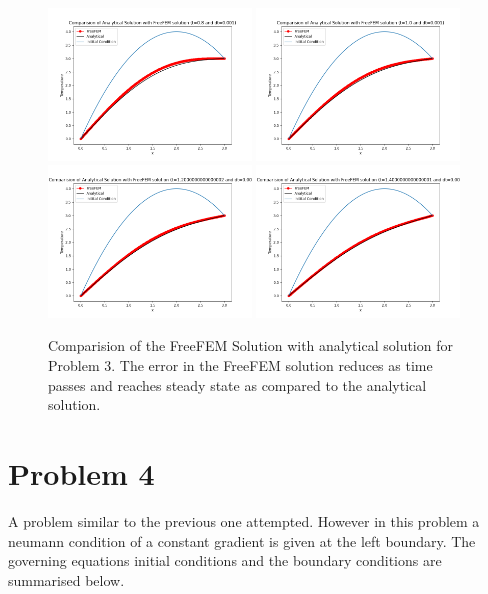 \documentclass[11pt]{article} %
\begin{document}
\begin{figure}[H]
\includegraphics[width=0.48\textwidth]{figures/p324.png}
\includegraphics[width=0.48\textwidth]{figures/p325.png}
\includegraphics[width=0.48\textwidth]{figures/p326.png}
\includegraphics[width=0.48\textwidth]{figures/p327.png}
\caption{Comparision of the FreeFEM Solution with analytical solution for Problem 3. The error in the FreeFEM solution reduces as time passes and reaches steady state as compared to the analytical solution.}
\end{figure}
\newpage
\section{Problem 4}
A problem similar to the previous one attempted. However in this problem a neumann condition of a constant gradient is given at the left boundary. The governing equations initial conditions and the boundary conditions are summarised below.
\end{document}
